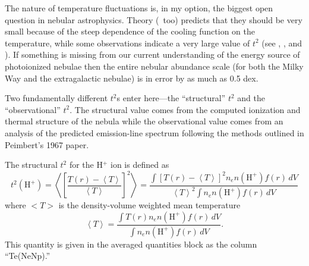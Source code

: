 The nature of temperature fluctuations is, in my option, the biggest
open question in nebular astrophysics.
Theory (\Cloudy\ too) predicts that
they should be very small because of the steep dependence of the cooling
function on the temperature, while some observations indicate a very large
value of $t^2$ (see \citealp{Liu1995}, \citealp{KingdonFerland1995}, and \citealp{Ferland2003}).
If something is missing from our current understanding of the energy source
of photoionized nebulae then the entire nebular abundance scale (for both
the Milky Way and the extragalactic nebulae) is in error by as much as 0.5
dex.

Two fundamentally different $t^2$s enter here---the ``structural''
$t^2$ and the ``observational'' $t^2$.
The structural value comes from the computed
ionization and thermal structure of the nebula while the observational value
comes from an analysis of the predicted emission-line spectrum following
the methods outlined in Peimbert's 1967 paper.

The structural $t^2$ for the H$^+$ ion is defined as
\begin{equation}
{t^2}\left( {{{\mathrm{H}}^ + }} \right) = \left\langle {{{\left[
{\frac{{T\left( r \right) - \left\langle T \right\rangle }}{{\left\langle
T \right\rangle }}} \right]}^2}} \right\rangle  = \frac{{\int {{{\left[
{T\left( r \right) - \left\langle T \right\rangle } \right]}^2}{n_e}n\left(
{{{\mathrm{H}}^ + }} \right)f\left( r \right)\,dV} }}{{{{\left\langle T
\right\rangle }^2}\int {{n_e}n\left( {{{\mathrm{H}}^ + }} \right)f\left( r
\right)\,dV} }}%
\end{equation}
where $<T>$ is the density-volume weighted mean temperature
\begin{equation}
\left\langle T \right\rangle  = \frac{{\int {T\left( r \right){n_e}n\left(
{{{\mathrm{H}}^ + }} \right)f\left( r \right)\,dV} }}{{\int {{n_e}n\left(
{{{\mathrm{H}}^ + }} \right)f\left( r \right)\,dV} }}.%
\end{equation}
This quantity is given in the averaged quantities block as the column
``Te(NeNp).''

